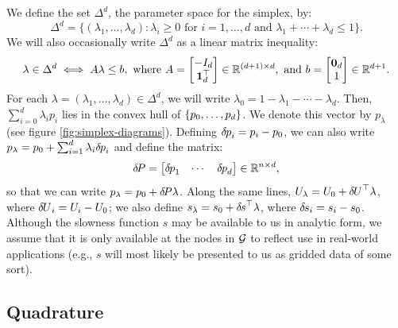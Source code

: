 \documentclass[smallcondensed]{svjour3}
\begin{document}
We define the set $\Delta^d$, the parameter space for the simplex, by:
\begin{equation}\label{eq:Delta-set}
  \Delta^d = \big\{(\lambda_1, \hdots, \lambda_d) : \lambda_i \geq 0 \mbox{ for } i = 1, \hdots, d \mbox{ and } \lambda_1 + \cdots + \lambda_d \leq 1\big\}.
\end{equation}
We will also occasionally write $\Delta^d$ as a linear matrix inequality:
\begin{equation}\label{eq:Delta-LMI}
  \lambda \in \Delta^d \iff A\lambda \leq b, \mbox{ where } A = \begin{bmatrix}
    -I_d \\ \boldsymbol{1}_{d}^\top
  \end{bmatrix} \in \mathbb{R}^{(d + 1) \times d}, \mbox{ and } b
  = \begin{bmatrix} \boldsymbol{0}_{d} \\ 1 \end{bmatrix} \in \mathbb{R}^{d +
    1}.
\end{equation}
For each $\lambda = (\lambda_1, \hdots, \lambda_d) \in \Delta^d$, we
will write $\lambda_0 = 1 - \lambda_1 - \cdots - \lambda_d$. Then,
$\sum_{i=0}^d \lambda_i p_i$ lies in the convex hull of
$\left\{p_0, \hdots, p_d\right\}$. We denote this vector by $p_\lambda$ (see
figure \ref{fig:simplex-diagrams}). Defining ${\delta \hspace{-0.08em} p}_i = p_i - p_0$, we
can also write $p_\lambda = p_0 + \sum_{i=1}^d \lambda_i {\delta \hspace{-0.08em} p}_i$ and
define the matrix:
\begin{equation}
  {\delta \hspace{-0.14em} P} = \begin{bmatrix} {\delta \hspace{-0.08em} p}_1 & \cdots & {\delta \hspace{-0.08em} p}_d \end{bmatrix} \in \mathbb{R}^{n \times d},
\end{equation}
so that we can write $p_\lambda = p_0 + {\delta \hspace{-0.14em} P} \lambda$. Along the same
lines, $U_\lambda = U_0 + {\delta \hspace{-0.09em} U}^\top \lambda$, where
${\delta \hspace{-0.09em} U}_i = U_i - U_0$; we also define
$s_\lambda = s_0 + {\delta \hspace{-0.1em} s}^\top \lambda$, where ${\delta \hspace{-0.1em} s}_i = s_i -
s_0$. Although the slowness function $s$ may be available to us in
analytic form, we assume that it is only available at the nodes in
$\mathcal{G}$ to reflect use in real-world applications (e.g., $s$ will most
likely be presented to us as gridded data of some sort).

\subsection{Quadrature}\label{ssec:quadrature}
\end{document}
